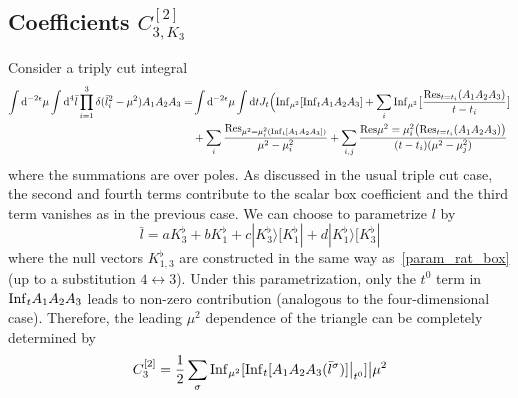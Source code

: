 \subsection*{Coefficients $C_{3,K_{3}}^{[2]}$}
Consider a triply cut integral
\begin{equation}
\begin{split}
\int \textrm{d}^{-2\epsilon}\mu \int \textrm{d}^4\bar{l}\prod_{i=1}^3\delta(\bar{l}_i^2 - \mu^2)A_1A_2A_3
= &
\int \textrm{d}^{-2\epsilon}\mu\int \textrm{d} t J_t \Big(
\mathrm{Inf}_{\mu^2}[\mathrm{Inf}_tA_1A_2A_3] 
+ \sum_i\mathrm{Inf}_{\mu^2}\big[\frac{\mathrm{Res}_{t=t_i}(A_1A_2A_3)}{t-t_i}\big]
\\ &
+ \sum_i\frac{\mathrm{Res}_{\mu^2 = \mu_i^2(\mathrm{Inf}_t[A_1A_2A_3])}}{\mu^2 -\mu_i^2}
+\sum_{i,j}\frac{\mathrm{Res}{\mu^2 = \mu_i^2}\big(\mathrm{Res}_{t=t_i}(A_1A_2A_3)\big)}{(t-t_i)(\mu^2 - \mu_j^2)}
\end{split}
\end{equation}
where the summations are over poles.
As discussed in the usual triple cut case, the second and fourth terms contribute to the scalar box coefficient and the third term vanishes as in the previous case.
We can choose to parametrize $l$ by
\begin{equation}
\bar{l} = a K_3^\flat + bK_1^\flat + c|K_3^\flat\rangle [K_1^\flat| + d|K_1^\flat\rangle[K_3^\flat|
\end{equation}
where the null vectors $K_{1,3}^\flat$ are constructed in the same way as~\cref{param_rat_box} (up to a substitution $4\leftrightarrow 3$).
Under this parametrization, only the $t^0$ term in $\mathrm{Inf}_tA_1A_2A_3$ leads to non-zero contribution (analogous to the four-dimensional case).
Therefore, the leading $\mu^2$ dependence of the triangle can be completely determined by 
\begin{equation}
C_3^{[2]} = \frac{1}{2}\sum_\sigma\mathrm{Inf}_{\mu^2}[\mathrm{Inf}_t[A_1A_2A_3(\bar{l}^\sigma)]\big|_{t^0}]\big|{\mu^2}
\end{equation}
%
%
